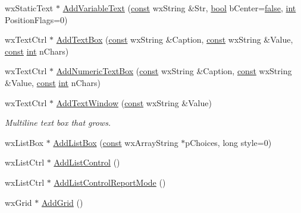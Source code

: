 \begin{DoxyCompactItemize}
\item 
wx\+Static\+Text $\ast$ \hyperlink{class_shuttle_gui_base_a8ba6dd56c6623a20eec280355d930967}{Add\+Variable\+Text} (\hyperlink{getopt1_8c_a2c212835823e3c54a8ab6d95c652660e}{const} wx\+String \&Str, \hyperlink{mac_2config_2i386_2lib-src_2libsoxr_2soxr-config_8h_abb452686968e48b67397da5f97445f5b}{bool} b\+Center=\hyperlink{mac_2config_2i386_2lib-src_2libsoxr_2soxr-config_8h_a65e9886d74aaee76545e83dd09011727}{false}, \hyperlink{xmltok_8h_a5a0d4a5641ce434f1d23533f2b2e6653}{int} Position\+Flags=0)
\item 
wx\+Text\+Ctrl $\ast$ \hyperlink{class_shuttle_gui_base_aa9df960a9ed7fdffec419912b995788e}{Add\+Text\+Box} (\hyperlink{getopt1_8c_a2c212835823e3c54a8ab6d95c652660e}{const} wx\+String \&Caption, \hyperlink{getopt1_8c_a2c212835823e3c54a8ab6d95c652660e}{const} wx\+String \&Value, \hyperlink{getopt1_8c_a2c212835823e3c54a8ab6d95c652660e}{const} \hyperlink{xmltok_8h_a5a0d4a5641ce434f1d23533f2b2e6653}{int} n\+Chars)
\item 
wx\+Text\+Ctrl $\ast$ \hyperlink{class_shuttle_gui_base_a7fb59a473043dbea364988c05d769d51}{Add\+Numeric\+Text\+Box} (\hyperlink{getopt1_8c_a2c212835823e3c54a8ab6d95c652660e}{const} wx\+String \&Caption, \hyperlink{getopt1_8c_a2c212835823e3c54a8ab6d95c652660e}{const} wx\+String \&Value, \hyperlink{getopt1_8c_a2c212835823e3c54a8ab6d95c652660e}{const} \hyperlink{xmltok_8h_a5a0d4a5641ce434f1d23533f2b2e6653}{int} n\+Chars)
\item 
wx\+Text\+Ctrl $\ast$ \hyperlink{class_shuttle_gui_base_a80c9119429827fe2a5815fd0e99d5cf1}{Add\+Text\+Window} (\hyperlink{getopt1_8c_a2c212835823e3c54a8ab6d95c652660e}{const} wx\+String \&Value)
\begin{DoxyCompactList}\small\item\em Multiline text box that grows. \end{DoxyCompactList}\item 
wx\+List\+Box $\ast$ \hyperlink{class_shuttle_gui_base_a856571912ad977b99aa3338dbb8579af}{Add\+List\+Box} (\hyperlink{getopt1_8c_a2c212835823e3c54a8ab6d95c652660e}{const} wx\+Array\+String $\ast$p\+Choices, long style=0)
\item 
wx\+List\+Ctrl $\ast$ \hyperlink{class_shuttle_gui_base_a2ba4496f5a2bbc64bc30e9a108b5dc67}{Add\+List\+Control} ()
\item 
wx\+List\+Ctrl $\ast$ \hyperlink{class_shuttle_gui_base_a01ff9997e519c505a1d83d2afbd2102b}{Add\+List\+Control\+Report\+Mode} ()
\item 
wx\+Grid $\ast$ \hyperlink{class_shuttle_gui_base_aa3e31cd37eadb80712f30a025f20f8ed}{Add\+Grid} ()

\end{DoxyCompactItemize}
